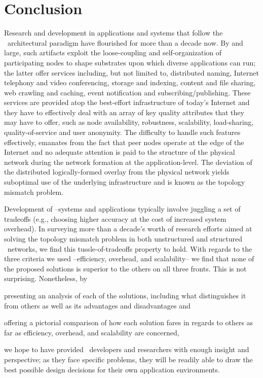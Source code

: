 \section{Conclusion}
\label{section:conclusion}

Research and development in applications and systems that follow the 
\p\ architectural paradigm have flourished for more than a decade now.
By and large, such artifacts exploit the loose-coupling and self-organization 
of participating nodes to shape substrates upon which diverse applications 
can run; the latter offer services including, but not limited to, 
distributed naming, 
Internet telephony and video conferencing, 
storage and indexing, 
content and file sharing, 
web crawling and caching, 
event notification and subscribing/publishing.
These services are provided atop the 
best-effort infrastructure of today's Internet 
and they have to effectively deal with an array of key quality attributes that
they may have to offer, such as node availability, robustness,
scalability, load-sharing, quality-of-service and user anonymity.
The difficulty to handle such features effectively, emanates from the fact that
peer nodes operate at the edge of the Internet and no adequate attention 
is paid to the structure of the physical network during the 
network formation at the application-level.
The deviation of the distributed logically-formed overlay from the 
physical network yields suboptimal use of the underlying 
infrastructure and is known as the topology mismatch
problem.

Development of \p--systems and applications
typically involve juggling a set of tradeoffs (e.g.,
choosing higher accuracy at the cost of increased system overhead).
In surveying more than
a decade's worth of research efforts aimed at solving the topology mismatch
problem in both unstructured and structured \p\ networks, we find this
tussle-of-tradeoffs property to hold.  
With regards to the three criteria we used --efficiency,
overhead, and scalability-- we find that none of the proposed solutions 
is superior to the others on all three fronts.  This is not surprising.
Nonetheless, by
\begin{inparaenum}
  \item presenting an analysis of each of the solutions,
including what distinguishes it from 
others as well as its advantages and disadvantages and 
  \item offering a pictorial
comparison of how each solution fares in regards to others as far as
efficiency, overhead, and scalability are concerned,
\end{inparaenum}
we hope to have provided \p\
developers and researchers with enough insight and perspective;
as they face specific problems, they will be readily able to 
draw the best possible design decisions for their own application
environments.
